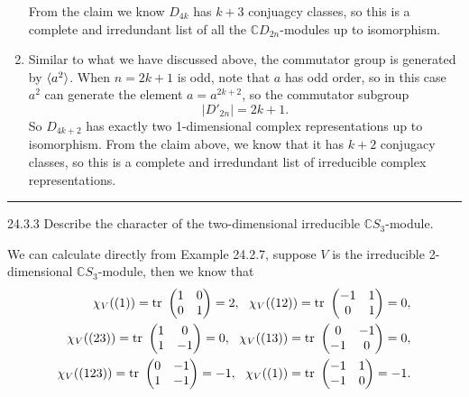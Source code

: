 \documentclass[a4paper, 12pt]{article}
\begin{document}
\begin{solution}
\begin{enumerate}[(1)]
From the claim we know \(D_{4k}\) has \(k+3\) conjuagcy classes, so this is a complete and irredundant list of all the \(\mathbb{C}D_{2n}\)-modules up to isomorphism.
\item Similar to what we have discussed above, the commutator group is generated by \(\langle a^2\rangle\). When \(n=2k+1\) is odd, note that \(a\) has odd order, so in this case \(a^2\) can generate the element \(a=a^{2k+2}\), so the commutator subgroup   
\[|D'_{2n}|=2k+1.\]
So \(D_{4k+2}\) has exactly two 1-dimensional complex representations up to isomorphism. From the claim above, we know that it has \(k+2\) conjugacy classes, so this is a complete and irredundant list of irreducible complex representations.
\end{enumerate}
\end{solution}

\noindent\rule{7in}{2.8pt}
\begin{problem}{24.3.3}
Describe the character of the two-dimensional irreducible \(\mathbb{C}S_3\)-module.
\end{problem}
\begin{solution}
We can calculate directly from Example 24.2.7, suppose \(V\) is the irreducible 2-dimensional \(\mathbb{C}S_3\)-module, then we know that 
\begin{align*}
	\chi_V((1))=\text{tr}\ \begin{pmatrix}
		1&0\\ 
		0&1
	\end{pmatrix}=2,\ \ \chi_V((12))=\text{tr}\ \begin{pmatrix}
		-1&1\\ 
		0&1
	\end{pmatrix}=0,\\ 
	\chi_V((23))=\text{tr}\ \begin{pmatrix}
        1&0\\ 
		1&-1
	\end{pmatrix}=0,\ \ \chi_V((13))=\text{tr}\ \begin{pmatrix}
	     0&-1\\ 
		-1&0
	\end{pmatrix}=0,\\ 
	\chi_V((123))=\text{tr}\ \begin{pmatrix}
         0&-1\\ 
		 1&-1
	\end{pmatrix}=-1,\ \ \chi_V((1))=\text{tr}\ \begin{pmatrix}
	     -1&1\\ 
		 -1&0
	\end{pmatrix}=-1.
\end{align*}
\end{solution}
\end{document}

